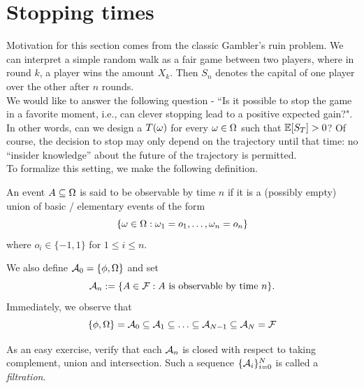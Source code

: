 \documentclass[main]{subfiles}
\begin{document}
\begin{obs}
\begin{enumerate}

    \end{enumerate}
\end{obs}

\section{Stopping times}

Motivation for this section comes from the classic Gambler's ruin problem. We can interpret a simple random walk as a fair game between two players, where in round $ k $, a player wins the amount $ X_k $. Then $ S_n $ denotes the capital of one player over the other after $ n $ rounds.\\

We would like to answer the following question - ``Is it possible to stop the game in a favorite moment, i.e., can clever stopping lead to a positive expected gain?". In other words, can we design a $ T(\omega) $ for every $ \omega\in\Omega $ such that $ \mathbb E[S_T] > 0 $? Of course, the decision to stop may only depend on the trajectory until that time: no ``insider knowledge” about the future of the trajectory is permitted.\\

To formalize this setting, we make the following definition.\\

\begin{definition}
    An event $ A\subseteq\Omega $ is said to be observable by time $ n $ if it is a (possibly empty) union of basic / elementary events of the form \[\{\omega\in\Omega:\omega_1=o_1,\ldots,\omega_n=o_n\}\] where $ o_i\in\{-1,1\} $ for $ 1\le i\le n $.
\end{definition}

We also define $ \mathcal A_0=\{\phi, \Omega\} $ and set \[\mathcal A_n:=\{A\in\mathcal F:A \text{ is observable by time }n\}.\]
Immediately, we observe that \[\{\phi, \Omega\}=\mathcal A_0\subseteq\mathcal A_1\subseteq\ldots\subseteq\mathcal A_{N-1}\subseteq\mathcal A_N=\mathcal F \]

As an easy exercise, verify that each $ \mathcal A_n $ is closed with respect to taking complement, union and intersection. Such a sequence $ \{\mathcal A_i\}_{i=0}^N $ is called a \textit{filtration}.
\end{document}
